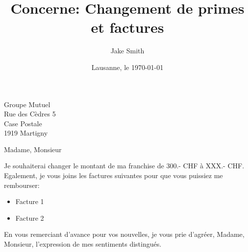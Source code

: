 \documentclass{chletter}
\author {Jake Smith}
\date{Lausanne, le \today}
\title{\textbf{
Concerne: Changement de primes et factures
}}
\def\encl{Annexes : }
\def\cc{Copie à : }
\begin{document}
\begin{letter}{
            Groupe Mutuel\\
            Rue des Cèdres 5\\
            Case Postale\\
            1919 Martigny
              }

\object

\opening{Madame, Monsieur}

Je souhaiterai changer le montant de ma franchise de 300.- CHF à XXX.- CHF.
Egalement, je vous joins les factures suivantes pour que vous puissiez me rembourser: 
\begin{itemize}
  \item Facture 1
  \item Facture 2
\end{itemize}

\closing{
  En vous remerciant d’avance pour vos nouvelles, je vous prie d’agréer, Madame, Monsieur, l’expression de mes sentiments distingués.
}





\end{letter}
\end{document}
